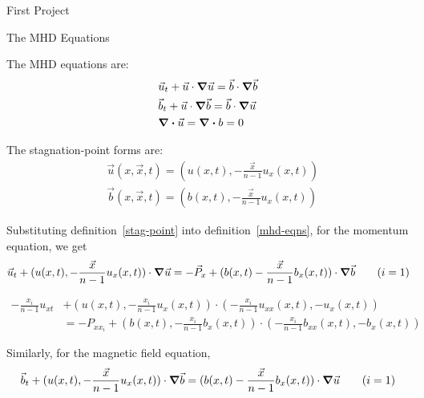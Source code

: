 \documentclass[11pt]{report}
\begin{document}
\begin{chapter}{First Project}
	\begin{section}{The MHD Equations}

		\begin{definition}
		\label{mhd-eqns}
			The MHD equations are:
			\begin{align*}
				&\vec{u}_t + \vec{u} \cdot \grad \vec{u} =
					\vec{b} \cdot \grad \vec{b} \\
				&\vec{b}_t + \vec{u} \cdot \grad \vec{b} =
					\vec{b} \cdot \grad \vec{u} \\
				&\div{\vec{u}} = \div{b} = 0
			\end{align*}
		\end{definition}

		\begin{definition}
		\label{stag-point}
			The stagnation-point forms are:
			\begin{align*}
				&\vec{u}(x, \vec{x}, t) =
					(u(x, t), -\frac{\vec{x}}{n - 1} u_x(x, t)) \\
				&\vec{b}(x, \vec{x}, t) =
					(b(x, t), -\frac{\vec{x}}{n - 1} u_x(x, t)) 	
			\end{align*}
		\end{definition}
		
		\begin{result}
			Substituting definition~\ref{stag-point} into definition~\ref{mhd-eqns},
			for the momentum equation, we get
			\begin{equation*}
				\vec{u}_t +
					(u(x, t), -\frac{\vec{x}}{n - 1} u_x(x, t)) \cdot \grad \vec{u}
				= -\vec{P}_x +
					(b(x, t) -\frac{\vec{x}}{n - 1} b_x(x, t)) \cdot \grad \vec{b}
				\tag{$i = 1$}
			\end{equation*}

			\begin{equation*}
				\begin{split}
					-\frac{x_i}{n - 1} u_{xt} &+
					(u(x, t), -\frac{x_i}{n - 1} u_x(x, t))
						\cdot (-\frac{x_i}{n - 1} u_{xx}(x, t), -u_x(x, t)) \\
					&= -P_{xx_i} + (b(x, t), -\frac{x_i}{n - 1} b_x(x, t))
						\cdot (-\frac{x_i}{n - 1} b_{xx}(x, t), -b_x(x, t))
				\end{split}
				\tag{$i > 1$}
			\end{equation*}

			Similarly, for the magnetic field equation,
			\begin{equation*}
				\vec{b}_t +
					(u(x, t), -\frac{\vec{x}}{n - 1} u_x(x, t)) \cdot \grad \vec{b}
				= (b(x, t) -\frac{\vec{x}}{n - 1} b_x(x, t)) \cdot \grad \vec{u}
				\tag{$i = 1$}
			\end{equation*}
			

\end{result}
\end{section}
\end{chapter}
\end{document}

